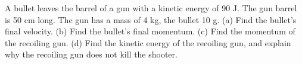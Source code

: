 A bullet leaves the barrel of a gun with a kinetic energy
        of 90 J. The gun barrel is 50 cm long. The gun has a mass of
        4 kg, the bullet 10 g.\hwendpart
        (a) Find the bullet's final velocity. \answercheck\hwendpart
        (b) Find the bullet's final momentum. \answercheck\hwendpart
        (c) Find the momentum of the recoiling gun.\hwendpart
        (d) Find the kinetic energy of the recoiling gun, and
        explain why the recoiling gun does not kill the shooter. \answercheck
